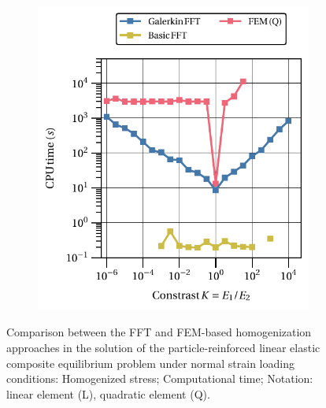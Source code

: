 \begin{figure}[hbt]
\begin{subfigure}[b]{0.49\textwidth}
      \centering
      \includegraphics[width=\textwidth]{figures/linear_3D_normal_stress_avg_cpu_time_vs_n_voxels}
      \caption{}
      \label{subfig:linear_3D_normal_stress_avg_cpu_time_vs_n_voxels}
    \end{subfigure}
  \caption{Comparison between the FFT and FEM-based homogenization approaches in the solution
  of the particle-reinforced linear elastic composite equilibrium problem under normal strain
  loading conditions:  Homogenized
  stress;  Computational time;
  Notation: linear element (L), quadratic element (Q).}
\label{fig:linear_3D_normal_stiff_contrast}
\end{figure}

